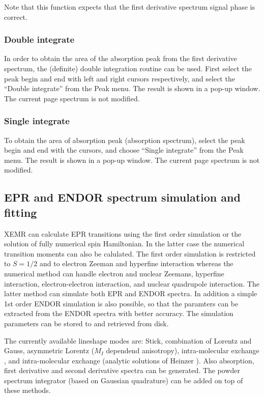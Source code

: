 \documentclass[byrevtex,amssymb,aps,pra,floatfix,letterpaper]{revtex4}
\begin{document}
\noindent
Note that this function expects that the first derivative spectrum signal phase is correct.

\subsubsection{Double integrate}

In order to obtain the area of the absorption peak from the first derivative spectrum, the (definite) double integration routine can be used. First select the peak begin and end with left and right cursors respectively, and select the ``Double integrate'' from the Peak menu. The result is shown in a pop-up window. The current page spectrum is not modified.

\subsubsection{Single integrate}

To obtain the area of absorption peak (absorption spectrum), select the peak begin and end with the cursors, and choose ``Single integrate'' from the Peak menu. The result is shown in a pop-up window. The current page spectrum is not modified.

\subsection{EPR and ENDOR spectrum simulation and fitting}

XEMR can calculate EPR transitions using the first order simulation or the solution of fully numerical spin Hamiltonian. In the latter case the numerical transition moments can also be calulated. The first order simulation is restricted to $S=1/2$ and to electron Zeeman and hyperfine interaction whereas the numerical method can handle electron and nuclear Zeemans, hyperfine interaction, electron-electron interaction, and nuclear quadrupole interaction. The latter method can simulate both EPR and ENDOR spectra. In addition a simple 1st order ENDOR simulation is also possible, so that the paramters can be extracted from the ENDOR spectra with better accuracy. The simulation parameters can be stored to and retrieved from disk.

The currently available lineshape modes are: Stick, combination of Lorentz and Gauss, asymmetric Lorentz ($M_I$ dependend anisotropy), intra-molecular exchange \cite{norris}, and intra-molecular exchange (analytic solutions of Heinzer \cite{heinzer}). Also absorption, first derivative and second derivative spectra can be generated. The powder spectrum integrator (based on Gaussian quadrature) can be added on top of these methods.
\end{document}
